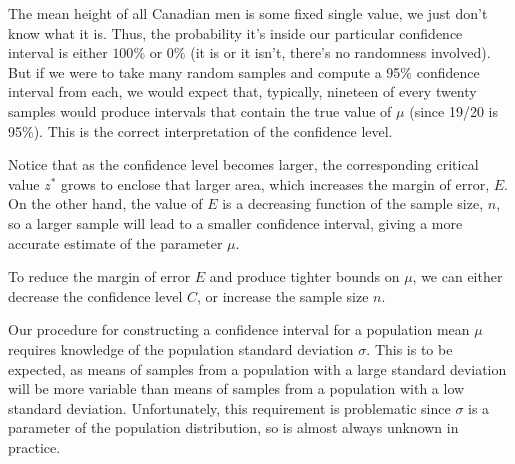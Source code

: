 The mean height of all Canadian men is some fixed single value, we just don't know what it is. Thus, the probability it's inside our particular confidence interval is either $100\%$ or $0\%$ (it is or it isn't, there's no randomness involved). But if we were to take many random samples and compute a 95\% confidence interval from each, we would expect that, typically, nineteen of every twenty samples would produce intervals that contain the true value of $\mu$ (since 19/20 is 95\%). This is the correct interpretation of the confidence level.
\begin{center}
\end{center}

Notice that as the confidence level becomes larger, the corresponding critical value $z^*$ grows to enclose that larger area, which increases the margin of error, $E$. On the other hand, the value of $E$ is a decreasing function of the sample size, $n$, so a larger sample will lead to a smaller confidence interval, giving a more accurate estimate of the parameter $\mu$.
\begin{prop} To reduce the margin of error $E$ and produce tighter bounds on $\mu$, we can either decrease the confidence level $C$, or increase the sample size $n$.
\end{prop}

Our procedure for constructing a confidence interval for a population mean $\mu$ requires knowledge of the population standard deviation $\sigma$. This is to be expected, as means of samples from a population with a large standard deviation will be more variable than means of samples from a population with a low standard deviation. Unfortunately, this requirement is problematic since $\sigma$ is a parameter of the population distribution, so is almost always unknown in practice.

